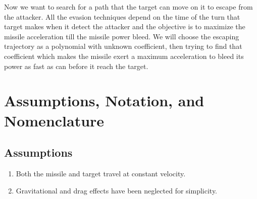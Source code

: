	
	 
	 
	
	



Now we want to search for a path that the target can move on it to escape from the attacker. All the evasion techniques depend on the time of the turn that target makes when it detect the attacker and the objective is to maximize the missile acceleration till the missile power bleed. 
We will  choose the escaping trajectory as a polynomial with unknown coefficient, then trying to find that coefficient which makes the missile exert a maximum acceleration to bleed its power as fast as can before it reach the target.  
\section{Assumptions, Notation, and Nomenclature}
\subsection*{Assumptions}

\begin{enumerate}
	\item Both the missile and target travel at constant velocity.
	\item Gravitational and drag effects have been neglected for simplicity.
\end{enumerate}

